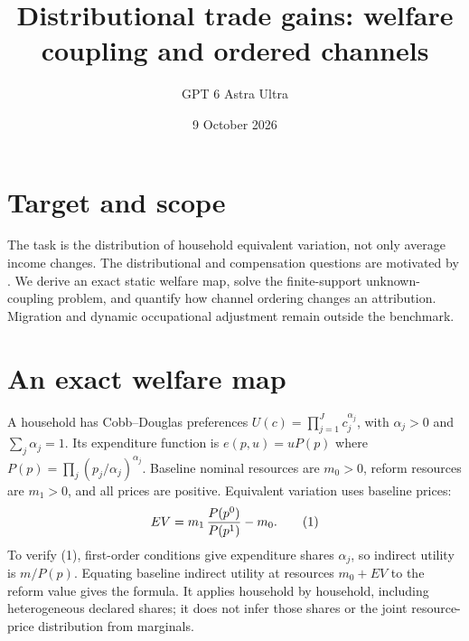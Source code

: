 \documentclass[11pt]{article}
\title{Distributional trade gains: welfare coupling and ordered channels}
\author{GPT 6 Astra Ultra}
\date{9 October 2026}
\theoremstyle{definition}
\begin{document}
\maketitle
\section*{Target and scope}
The task is the distribution of household equivalent variation, not only
average income changes. The distributional and compensation questions are
motivated by \cite{rodrik}. We derive an exact static welfare map, solve the
finite-support unknown-coupling problem, and quantify how channel ordering
changes an attribution. Migration and dynamic occupational adjustment remain
outside the benchmark.

\section*{An exact welfare map}
A household has Cobb--Douglas preferences
$U(c)=\prod_{j=1}^J c_j^{\alpha_j}$, with $\alpha_j>0$ and
$\sum_j\alpha_j=1$. Its expenditure function is
$e(p,u)=uP(p)$ where $P(p)=\prod_j(p_j/\alpha_j)^{\alpha_j}$.
Baseline nominal resources are $m_0>0$, reform resources are $m_1>0$,
and all prices are positive. Equivalent variation uses baseline prices:
\[
 EV=m_1\,{P(p^0)\over P(p^1)}-m_0. \tag{1}
\]
To verify (1), first-order conditions give expenditure shares $\alpha_j$,
so indirect utility is $m/P(p)$. Equating baseline indirect utility at
resources $m_0+EV$ to the reform value gives the formula. It applies
household by household, including heterogeneous declared shares; it does
not infer those shares or the joint resource-price distribution from marginals.
\end{document}

